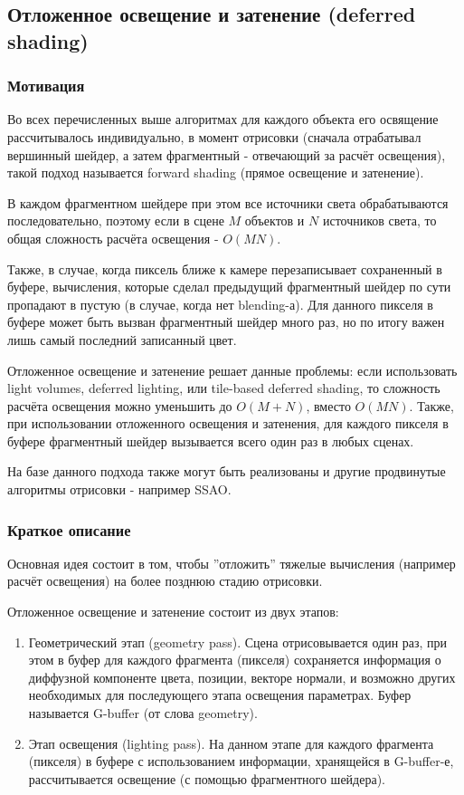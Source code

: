 \documentclass[14pt]{extarticle}
\begin{document}
\subsection{Отложенное освещение и затенение (deferred shading)}
\subsubsection{Мотивация}
Во всех перечисленных выше алгоритмах для каждого объекта его освящение рассчитывалось индивидуально, в момент отрисовки (сначала отрабатывал вершинный шейдер, а затем фрагментный - отвечающий за расчёт освещения), такой подход называется forward shading (прямое освещение и затенение). 

В каждом фрагментном шейдере при этом все источники света обрабатываются последовательно, поэтому если в сцене $M$ объектов и $N$ источников света, то общая сложность расчёта освещения - $O(MN)$. 

Также, в случае, когда пиксель ближе к камере перезаписывает сохраненный в буфере, вычисления, которые сделал предыдущий фрагментный шейдер по сути пропадают в пустую (в случае, когда нет blending-а). Для данного пикселя в буфере может быть вызван фрагментный шейдер много раз, но по итогу важен лишь самый последний записанный цвет.

Отложенное освещение и затенение решает данные проблемы: если использовать light volumes, deferred lighting, или tile-based deferred shading, то сложность расчёта освещения можно уменьшить до $O(M+N)$, вместо $O(MN)$. Также, при использовании отложенного освещения и затенения, для каждого пикселя в буфере фрагментный шейдер вызывается всего один раз в любых сценах.

На базе данного подхода также могут быть реализованы и другие продвинутые алгоритмы отрисовки - например SSAO.

\subsubsection{Краткое описание}
Основная идея состоит в том, чтобы ''отложить'' тяжелые вычисления (например расчёт освещения) на более позднюю стадию отрисовки.

Отложенное освещение и затенение состоит из двух этапов:
\begin{enumerate}
	\item Геометрический этап (geometry pass). Сцена отрисовывается один раз, при этом в буфер для каждого фрагмента (пикселя) сохраняется информация о диффузной компоненте цвета, позиции, векторе нормали, и возможно других необходимых для последующего этапа освещения параметрах. Буфер называется G-buffer (от слова geometry).
	\item Этап освещения (lighting pass). На данном этапе для каждого фрагмента (пикселя) в буфере с использованием информации, хранящейся в G-buffer-е, рассчитывается освещение (с помощью фрагментного шейдера).
\end{enumerate}
\end{document}
